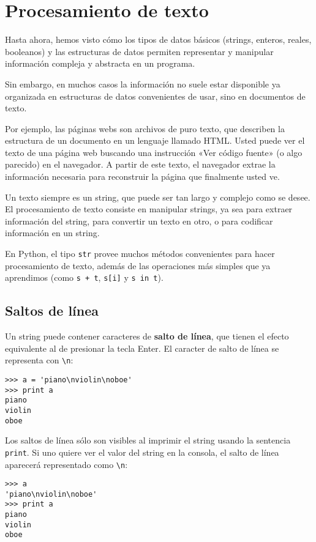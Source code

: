 \chapter{Procesamiento de texto}

Hasta ahora, hemos visto cómo los tipos de datos básicos (strings,
enteros, reales, booleanos) y las estructuras de datos permiten
representar y manipular información compleja y abstracta en un programa.

Sin embargo, en muchos casos la información no suele estar disponible ya
organizada en estructuras de datos convenientes de usar, sino en
documentos de texto.

Por ejemplo, las páginas webs son archivos de puro texto, que describen
la estructura de un documento en un lenguaje llamado HTML. Usted puede
ver el texto de una página web buscando una instrucción «Ver código
fuente» (o algo parecido) en el navegador. A partir de este texto, el
navegador extrae la información necesaria para reconstruir la página que
finalmente usted ve.

Un texto siempre es un string, que puede ser tan largo y complejo como
se desee. El procesamiento de texto consiste en manipular strings, ya
sea para extraer información del string, para convertir un texto en
otro, o para codificar información en un string.

En Python, el tipo \lstinline!str! provee muchos métodos convenientes
para hacer procesamiento de texto, además de las operaciones más simples
que ya aprendimos (como \lstinline!s + t!, \lstinline!s[i]! y
\lstinline!s in t!).

\section{Saltos de línea}

Un string puede contener caracteres de \textbf{salto de línea}, que
tienen el efecto equivalente al de presionar la tecla Enter. El caracter
de salto de línea se representa con \lstinline!\n!:

\begin{lstlisting}
>>> a = 'piano\nviolin\noboe'
>>> print a
piano
violin
oboe
\end{lstlisting}

Los saltos de línea sólo son visibles al imprimir el string usando la
sentencia \lstinline!print!. Si uno quiere ver el valor del string en la
consola, el salto de línea aparecerá representado como \lstinline!\n!:

\begin{lstlisting}
>>> a
'piano\nviolin\noboe'
>>> print a
piano
violin
oboe
\end{lstlisting}

